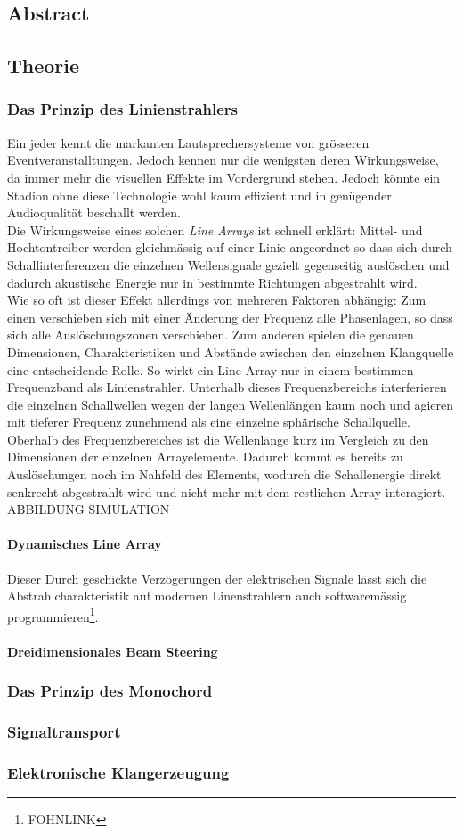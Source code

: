 \subsection{Abstract}
\subsection{Theorie}
\subsubsection{Das Prinzip des Linienstrahlers}
Ein jeder kennt die markanten Lautsprechersysteme von grösseren Eventveranstalltungen. Jedoch kennen nur die wenigsten deren Wirkungsweise, da immer mehr die visuellen Effekte im Vordergrund stehen. Jedoch könnte ein Stadion ohne diese Technologie wohl kaum effizient und in genügender Audioqualität beschallt werden.\\Die Wirkungsweise eines solchen \textit{Line Arrays} ist schnell erklärt: Mittel- und Hochtontreiber werden gleichmässig auf einer Linie angeordnet so dass sich durch Schallinterferenzen die einzelnen Wellensignale gezielt gegenseitig auslöschen und dadurch akustische Energie nur in bestimmte Richtungen abgestrahlt wird. \\Wie so oft ist dieser Effekt allerdings von mehreren Faktoren abhängig: Zum einen verschieben sich mit einer Änderung der Frequenz alle Phasenlagen, so dass sich alle Auslöschungszonen verschieben. Zum anderen spielen die genauen Dimensionen, Charakteristiken und Abstände zwischen den einzelnen Klangquelle eine entscheidende Rolle. So wirkt ein Line Array nur in einem bestimmen Frequenzband als Linienstrahler. Unterhalb dieses Frequenzbereichs interferieren die einzelnen Schallwellen wegen der langen Wellenlängen kaum noch und agieren mit tieferer Frequenz zunehmend als eine einzelne sphärische Schallquelle. Oberhalb des Frequenzbereiches ist die Wellenlänge kurz im Vergleich zu den Dimensionen der einzelnen Arrayelemente. Dadurch kommt es bereits zu Auslöschungen noch im Nahfeld des Elements, wodurch die Schallenergie direkt senkrecht abgestrahlt wird und nicht mehr mit dem restlichen Array interagiert.
{\color{red} ABBILDUNG SIMULATION}
\paragraph{Dynamisches Line Array}
Dieser  Durch geschickte Verzögerungen der elektrischen Signale lässt sich die Abstrahlcharakteristik auf modernen Linenstrahlern auch softwaremässig programmieren\footnote{\color{red}FOHNLINK}.
\paragraph{Dreidimensionales Beam Steering}
\subsubsection{Das Prinzip des Monochord}
\subsubsection{Signaltransport}
\subsubsection{Elektronische Klangerzeugung}
